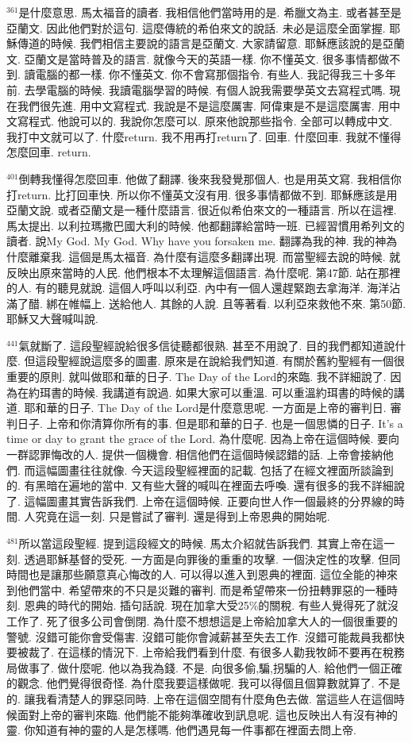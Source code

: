 \documentclass{book}
\begin{document}
$^{361}$是什麼意思.
馬太福音的讀者.
我相信他們當時用的是.
希臘文為主.
或者甚至是亞蘭文.
因此他們對於這句.
這麼傳統的希伯來文的說話.
未必是這麼全面掌握.
耶穌傳道的時候.
我們相信主要說的語言是亞蘭文.
大家請留意.
耶穌應該說的是亞蘭文.
亞蘭文是當時普及的語言.
就像今天的英語一樣.
你不懂英文.
很多事情都做不到.
讀電腦的都一樣.
你不懂英文.
你不會寫那個指令.
有些人.
我記得我三十多年前.
去學電腦的時候.
我讀電腦學習的時候.
有個人說我需要學英文去寫程式嗎.
現在我們很先進.
用中文寫程式.
我說是不是這麼厲害.
阿偉東是不是這麼厲害.
用中文寫程式.
他說可以的.
我說你怎麼可以.
原來他說那些指令.
全部可以轉成中文.
我打中文就可以了.
什麼return.
我不用再打return了.
回車.
什麼回車.
我就不懂得怎麼回車.
return.

$^{401}$倒轉我懂得怎麼回車.
他做了翻譯.
後來我發覺那個人.
也是用英文寫.
我相信你打return.
比打回車快.
所以你不懂英文沒有用.
很多事情都做不到.
耶穌應該是用亞蘭文說.
或者亞蘭文是一種什麼語言.
很近似希伯來文的一種語言.
所以在這裡.
馬太提出.
以利拉瑪撒巴國大利的時候.
他都翻譯給當時一班.
已經習慣用希列文的讀者.
說My God.
My God.
Why have you forsaken me.
翻譯為我的神.
我的神為什麼離棄我.
這個是馬太福音.
為什麼有這麼多翻譯出現.
而當聖經去說的時候.
就反映出原來當時的人民.
他們根本不太理解這個語言.
為什麼呢.
第47節.
站在那裡的人.
有的聽見就說.
這個人呼叫以利亞.
內中有一個人還趕緊跑去拿海洋.
海洋沾滿了醋.
綁在帷幅上.
送給他人.
其餘的人說.
且等著看.
以利亞來救他不來.
第50節.
耶穌又大聲喊叫說.

$^{441}$氣就斷了.
這段聖經說給很多信徒聽都很熟.
甚至不用說了.
目的我們都知道說什麼.
但這段聖經說這麼多的圖畫.
原來是在說給我們知道.
有關於舊約聖經有一個很重要的原則.
就叫做耶和華的日子.
The Day of the Lord的來臨.
我不詳細說了.
因為在約珥書的時候.
我講道有說過.
如果大家可以重溫.
可以重溫約珥書的時候的講道.
耶和華的日子.
The Day of the Lord是什麼意思呢.
一方面是上帝的審判日.
審判日子.
上帝和你清算你所有的事.
但是耶和華的日子.
也是一個思憐的日子.
It's a time or day to grant the grace of the Lord.
為什麼呢.
因為上帝在這個時候.
要向一群認罪悔改的人.
提供一個機會.
相信他們在這個時候認錯的話.
上帝會接納他們.
而這幅圖畫往往就像.
今天這段聖經裡面的記載.
包括了在經文裡面所談論到的.
有黑暗在遍地的當中.
又有些大聲的喊叫在裡面去呼喚.
還有很多的我不詳細說了.
這幅圖畫其實告訴我們.
上帝在這個時候.
正要向世人作一個最終的分界線的時間.
人究竟在這一刻.
只是嘗試了審判.
還是得到上帝恩典的開始呢.

$^{481}$所以當這段聖經.
提到這段經文的時候.
馬太介紹就告訴我們.
其實上帝在這一刻.
透過耶穌基督的受死.
一方面是向罪後的重重的攻擊.
一個決定性的攻擊.
但同時間也是讓那些願意真心悔改的人.
可以得以進入到恩典的裡面.
這位全能的神來到他們當中.
希望帶來的不只是災難的審判.
而是希望帶來一份扭轉罪惡的一種時刻.
恩典的時代的開始.
插句話說.
現在加拿大受25\%的關稅.
有些人覺得死了就沒工作了.
死了很多公司會倒閉.
為什麼不想想這是上帝給加拿大人的一個很重要的警號.
沒錯可能你會受傷害.
沒錯可能你會減薪甚至失去工作.
沒錯可能裁員我都快要被裁了.
在這樣的情況下.
上帝給我們看到什麼.
有很多人勸我牧師不要再在稅務局做事了.
做什麼呢.
他以為我為錢.
不是.
向很多偷,騙,拐騙的人.
給他們一個正確的觀念.
他們覺得很奇怪.
為什麼我要這樣做呢.
我可以得個且個算數就算了.
不是的.
讓我看清楚人的罪惡同時.
上帝在這個空間有什麼角色去做.
當這些人在這個時候面對上帝的審判來臨.
他們能不能夠準確收到訊息呢.
這也反映出人有沒有神的靈.
你知道有神的靈的人是怎樣嗎.
他們遇見每一件事都在裡面去問上帝.
\end{document}
